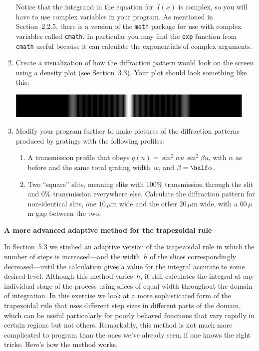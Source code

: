 \documentclass[12pt]{article}
\begin{document}
\begin{exercises}
\begin{enumerate}
  Notice that the integrand in the equation for~$I(x)$ is complex, so you
  will have to use complex variables in your program.  As mentioned in
  Section~2.2.5, there is a version of the \verb|math| package for use with
  complex variables called \verb|cmath|.  In particular you may find the
  \verb|exp| function from \verb|cmath| useful because it can calculate the
  exponentials of complex arguments.
\item Create a visualization of how the diffraction pattern would look on
  the screen using a density plot (see Section~3.3).  Your plot should look
  something like this: \medskip
\begin{center}
\includegraphics[width=12cm]{pattern.eps}
\end{center}
\smallskip
\item Modify your program further to make pictures of the diffraction
  patterns produced by gratings with the following profiles:
{\renewcommand{\labelenumii}{\roman{enumii})\ }
\begin{enumerate}\setlength{\itemsep}{0pt}
\item A transmission profile that obeys $q(u) = \sin^2\alpha u\,
  \sin^2\beta u$, with $\alpha$ as before and the same total grating
  width~$w$, and $\beta=\half\alpha$.
\item Two ``square'' slits, meaning slits with 100\% transmission through
  the slit and 0\% transmission everywhere else.  Calculate the diffraction
  pattern for non-identical slits, one $10\,\mu$m wide and the other
  $20\,\mu$m wide, with a $60\,\mu$m gap between the two.
\end{enumerate}}
\end{enumerate}



\exercise \textbf{A more advanced adaptive method for the trapezoidal
  rule}

\exskip In Section~5.3 we studied an adaptive version of the trapezoidal
rule in which the number of steps is increased---and the width~$h$ of the
slices correspondingly decreased---until the calculation gives a value for
the integral accurate to some desired level.  Although this method
varies~$h$, it still calculates the integral at any individual stage of the
process using slices of equal width throughout the domain of integration.
In this exercise we look at a more sophisticated form of the trapezoidal
rule that uses different step sizes in different parts of the domain, which
can be useful particularly for poorly behaved functions that vary rapidly
in certain regions but not others.  Remarkably, this method is not much
more complicated to program than the ones we've already seen, if one knows
the right tricks.  Here's how the method works.


\end{exercises}
\end{document}
